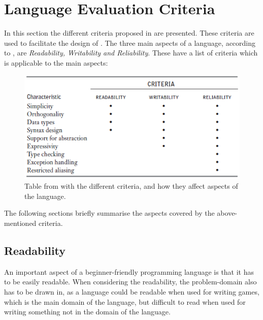 \section{Language Evaluation Criteria}
In this section the different criteria proposed in \cite{sebesta1.3} are presented. These criteria are used to facilitate the design of \lang{}.
The three main aspects of a language, according to \cite{sebesta1.3}, are \textit{Readability, Writability and Reliability}. These have a list of criteria which is applicable to the main aspects:
\begin{figure}[H]
    \centering
    \includegraphics[scale=1]{resources/Images/criteria.PNG}
    \caption{Table from \cite{sebesta1.3} with the different criteria, and how they affect aspects of the language.}\label{fig:Criteria}
\end{figure}
The following sections briefly summarise the aspects covered by the above-mentioned criteria.
\newpage
\subsection{Readability}
An important aspect of a beginner-friendly programming language is that it has to be easily readable. When considering the readability, the problem-domain also has to be drawn in, as a language could be readable when used for writing games, which is the main domain of the language, but difficult to read when used for writing something not in the domain of the language.
